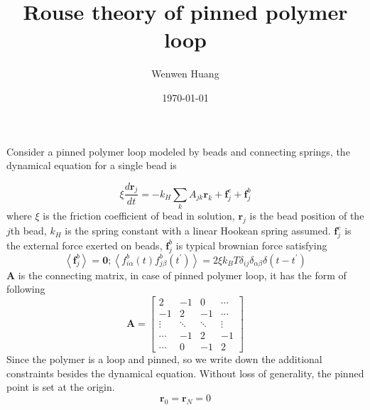 \documentclass[12pt,a4paper]{article}
\begin{document}
\title{Rouse theory of pinned polymer loop}
\author{Wenwen Huang}
\date{\today}

\maketitle


Consider a pinned polymer loop modeled by beads and connecting springs, the
dynamical equation for a single bead is 

\begin{equation}
    \label{eq:bead}
    \xi \frac{d \mathbf{r}_j}{dt} = - k_H \sum_{k} A_{jk} \mathbf{r}_k + \mathbf{f}_j^e + \mathbf{f}_j^b
\end{equation}
where $\xi$ is the friction coefficient of bead in solution, $\mathbf{r}_j$ is
the bead position of the $j$th bead, $k_H$ is the spring constant with a linear
Hookean spring assumed. $\mathbf{f}_j^e$ is the external force exerted on beads,
$\mathbf{f}_j^b$ is typical brownian force satisfying 
\begin{equation}
    \label{eq:brownian}
    \left<\mathbf{f}_j^b\right> = \mathbf 0; 
    \left<f_{i\alpha}^b(t)f_{j\beta}^b(t^\prime)\right> = 2\xi k_B T \delta_{ij}
    \delta_{\alpha\beta}\delta(t-t^\prime)
\end{equation}
$\mathbf A$ is the connecting matrix, in case of pinned polymer loop, it has the
form of following
\begin{equation}
    \label{eq:connectMatrix}
    \mathbf{A} = \begin{bmatrix}
        2 & -1 & 0   & \cdots   \\
        -1 & 2 & -1  &  \cdots  \\
        \vdots & \ddots &\ddots&\vdots\\
        \cdots & -1 &2 & -1 \\
        \cdots & 0 &-1 &2
    \end{bmatrix}
\end{equation}
Since the polymer is a loop and pinned, so we write down the additional
constraints besides the dynamical equation. Without loss of generality, the
pinned point is set at the origin.
\begin{equation}
    \label{eq:boudary}
    \mathbf r_0 = \mathbf r_N = 0
\end{equation}
\end{document}
